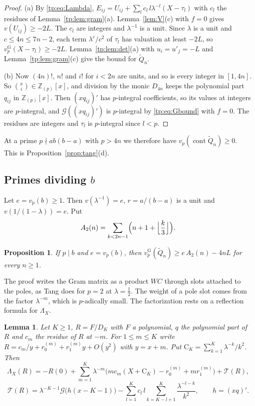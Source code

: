 \documentclass[11pt]{amsart}
\newtheorem{lemma}[theorem]{Lemma}
\newtheorem{proposition}[theorem]{Proposition}
\theoremstyle{definition}
\theoremstyle{remark}
\numberwithin{equation}{section}
\newcommand{\Z}{\mathbb Z}
\newcommand{\vG}{v_p^{\mathrm G}}
\newcommand{\cont}{\operatorname{cont}}
\begin{document}
\begin{proof}
(a) By \eqref{tp:eq:Lambda}, $E_{ij}=U_{ij}+\sum_lc_l\,l\lambda^{-l}(X-\tau_l)$ with $c_l$ the residues of
Lemma~\ref{tp:lem:gram}(a). Lemma~\ref{lem:V}(c) with $f=0$ gives $v(U_{ij})\ge-2L$. The $c_l$ are integers and
$\lambda^{-1}$ is a unit. Since $\lambda$ is a unit and $c\le4n\le7n-2$, each term $\lambda^c/c^2$ of $\tau_l$ has
valuation at least $-2L$, so $\vG(X-\tau_l)\ge-2L$. Lemma~\ref{tp:lem:det}(a) with $u_i=u'_j=-L$ and
Lemma~\ref{tp:lem:gram}(c) give the bound for $\tilde Q_n$.

(b) Now $(4n)!$, $n!$ and $i!$ for $i<2n$ are units, and so is every integer in $[1,4n]$. So $\binom xi\in\Z_{(p)}[x]$,
and division by the monic $D_{4n}$ keeps the polynomial part $q_{ij}$ in $\Z_{(p)}[x]$. Then $(xq_{ij})'$ has
$p$-integral coefficients, so its values at integers are $p$-integral, and $\mathcal G((xq_{ij})')$ is $p$-integral by
\eqref{tp:eq:Gbound} with $f=0$. The residues are integers and $\tau_l$ is $p$-integral since $l<p$.
\end{proof}

At a prime $p\nmid ab(b-a)$ with $p>4n$ we therefore have $v_p(\cont\tilde Q_n)\ge0$. This is
Proposition~\ref{prop:tang}(d).

\subsection{Primes dividing $b$}\label{tp:ssec:b}
Let $e=v_p(b)\ge1$. Then $v(\lambda^{-1})=e$, $r=a/(b-a)$ is a unit and $v(1/(1-\lambda))=e$. Put
\[
 A_2(n)=\sum_{k<2n-1}\Bigl(n+1+\Bigl\lfloor\frac k3\Bigr\rfloor\Bigr).
\]

\begin{proposition}\label{tp:prop:b}
If $p\mid b$ and $e=v_p(b)$, then $\vG(\tilde Q_n)\ge e\,A_2(n)-4nL$ for every $n\ge1$.
\end{proposition}

The proof writes the Gram matrix as a product $WC$ through slots attached to the poles, as Tang does for $p=2$ at
$\lambda=\frac12$. The weight of a pole slot comes from the factor $\lambda^{-m}$, which is $p$-adically small. The
factorization rests on a reflection formula for $\Lambda_X$.

\begin{lemma}\label{tp:lem:reflect}
Let $K\ge1$, $R=F/D_K$ with $F$ a polynomial, $q$ the polynomial part of $R$ and $c_m$ the residue of $R$ at $-m$. For
$1\le m\le K$ write $R=c_m/y+r_0^{(m)}+r_1^{(m)}y+O(y^2)$ with $y=x+m$. Put $\mathrm{C}_K=\sum_{k=1}^K\lambda^{-k}/k^2$.
Then
\[
 \Lambda_X(R)=-R(0)+\sum_{m=1}^K\lambda^{-m}\bigl(mc_m(X+\mathrm{C}_K)-r_0^{(m)}+mr_1^{(m)}\bigr)+\mathcal T(R),
\]
\[
 \mathcal T(R)=\lambda^{-K-1}\mathcal G\bigl(h(x-K-1)\bigr)-\sum_{l=1}^Kc_l\,l\sum_{k=K-l+1}^{K}\frac{\lambda^{-l-k}}{k^2},
 \qquad h=(xq)'.
\]
\end{lemma}
\end{document}
